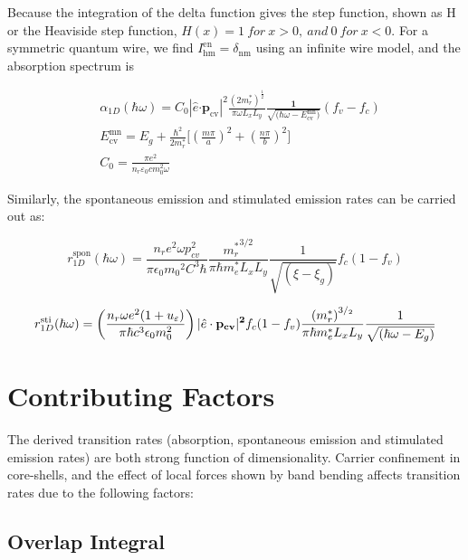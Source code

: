 Because the integration of the delta function gives the step function,
shown as H or the Heaviside step function,
\(H\left( x \right) = 1\ for\ x > 0,\ and\ 0\ for\ x < 0\). For a
symmetric quantum wire, we find
\(I_{\text{hm}}^{\text{en}} = \delta_{\text{nm}}\) using an infinite
wire model, and the absorption spectrum is

\begin{eqnarray}
  & \alpha_{1D}\left( \hbar\omega \right) = C_{0}\left| \hat{e}\bm{\cdot}\bm{p}_{\text{cv}} \right|^{2}\frac{\left( 2m_{r}^{*} \right)^{\frac{1}{2}}}{{\pi\omega}L_{x}L_{y}}\frac{\bm{1}}{\sqrt{\bm{(}\hbar\omega - E_{\text{cv}}^{\text{mn}}\bm{)}}}(f_v-f_c) \nonumber \\
  & E_{\text{cv}}^{\text{mn}} = E_{g} + \frac{\hbar^{2}}{2m_{r}^{\ast}}\lbrack\left( \frac{m\pi}{a} \right)^{2} + \left( \frac{n\pi}{b} \right)^{2}\rbrack \nonumber \\
  & C_{0} = \frac{\pi e^{2}}{n_{r}\varepsilon_{0}cm_{0}^{2}\omega}
\end{eqnarray}

Similarly, the spontaneous emission and stimulated emission rates can be
carried out as:

\begin{equation}
r_{1D}^{\mathrm{spon}}(\hbar\omega)=\frac{n_re^2\omega{p_{cv}^2}}{{\pi}\epsilon_0{m_0}^2C^3{\hbar}}\frac{{m_r^\ast}^{3/2}}{\pi\hbar{m_e^\ast}L_xL_y}\frac{1}{\sqrt{(\xi-\xi_g)}}{f_c}(1-f_v)
\end{equation}

\begin{equation}
r_{1D}^{\mathrm{sti}}(\hbar\omega)=\left(\frac{n_r\omega{e^2}(1+u_\varepsilon)}{\pi\hbar{c^3}\epsilon_0m_0^2}\right){|\hat{e}\cdot\bf{p}_{cv}|^2}f_c(1-f_v) \frac{{(m_r^\ast)}^{3/_2}}{\pi\hbar{m_e^\ast}{L_x}{L_y}}\frac{1}{\sqrt{(\hbar\omega-E_g)}}
\end{equation}

\section{Contributing Factors} \label{factor}

The derived transition rates (absorption, spontaneous emission and stimulated
emission rates) are both strong function of dimensionality. Carrier confinement
in core-shells, and the effect of local forces shown by band bending affects
transition rates due to the following factors:

\subsection{Overlap Integral}

